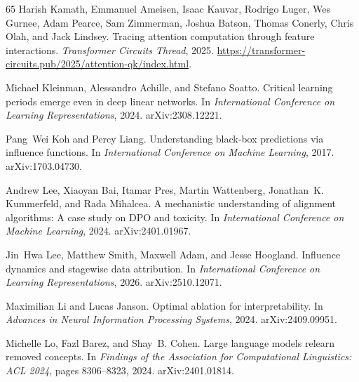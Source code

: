 \begin{thebibliography}{65}
Harish Kamath, Emmanuel Ameisen, Isaac Kauvar, Rodrigo Luger, Wes Gurnee, Adam Pearce, Sam Zimmerman, Joshua Batson, Thomas Conerly, Chris Olah, and Jack Lindsey.
\newblock Tracing attention computation through feature interactions.
\newblock \emph{Transformer Circuits Thread}, 2025.
\newblock \url{https://transformer-circuits.pub/2025/attention-qk/index.html}.

Michael Kleinman, Alessandro Achille, and Stefano Soatto.
\newblock Critical learning periods emerge even in deep linear networks.
\newblock In \emph{International Conference on Learning Representations}, 2024.
\newblock arXiv:2308.12221.

Pang~Wei Koh and Percy Liang.
\newblock Understanding black-box predictions via influence functions.
\newblock In \emph{International Conference on Machine Learning}, 2017.
\newblock arXiv:1703.04730.

Andrew Lee, Xiaoyan Bai, Itamar Pres, Martin Wattenberg, Jonathan~K. Kummerfeld, and Rada Mihalcea.
\newblock A mechanistic understanding of alignment algorithms: A case study on DPO and toxicity.
\newblock In \emph{International Conference on Machine Learning}, 2024.
\newblock arXiv:2401.01967.

Jin~Hwa Lee, Matthew Smith, Maxwell Adam, and Jesse Hoogland.
\newblock Influence dynamics and stagewise data attribution.
\newblock In \emph{International Conference on Learning Representations}, 2026.
\newblock arXiv:2510.12071.

Maximilian Li and Lucas Janson.
\newblock Optimal ablation for interpretability.
\newblock In \emph{Advances in Neural Information Processing Systems}, 2024.
\newblock arXiv:2409.09951.

Michelle Lo, Fazl Barez, and Shay~B. Cohen.
\newblock Large language models relearn removed concepts.
\newblock In \emph{Findings of the Association for Computational Linguistics: ACL 2024}, pages 8306--8323, 2024.
\newblock arXiv:2401.01814.


\end{thebibliography}
